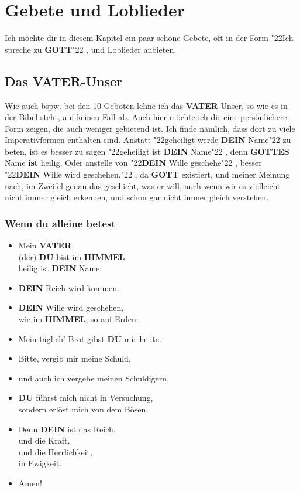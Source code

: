 \documentclass[10pt,a5paper]{article}
\newcommand{\Dein}[0]{\textbf{DEIN}}
\newcommand{\Du}[0]{\textbf{DU}}
\newcommand{\Gottes}[0]{\textbf{GOTTES}}
\newcommand{\Gott}[0]{\textbf{GOTT}}
\newcommand{\Himmel}[0]{\textbf{HIMMEL}}
\newcommand{\Vater}[0]{\textbf{VATER}}
\newcommand{\q}[1]{\char"22{#1}\char"22 }
\begin{document}
	\newpage
	\section{Gebete und Loblieder}
		Ich m\"ochte dir in diesem Kapitel ein paar sch\"one Gebete,
		oft in der Form \q{Ich spreche zu {\Gott}},
		und Loblieder anbieten.
	
	\subsection{Das {\Vater}-Unser}
		Wie auch bspw. bei den 10 Geboten lehne ich das {\Vater}-Unser,
		so wie es in der Bibel steht,
		auf keinen Fall ab.
		Auch hier m\"ochte ich dir eine pers\"onlichere Form zeigen,
		die auch weniger gebietend ist.
		Ich finde n\"amlich,
		dass dort zu viele Imperativformen enthalten sind.
		Anstatt \q{geheiligt werde {\Dein} Name} zu beten,
		ist es besser zu sagen \q{geheiligt ist {\Dein} Name},
		denn {\Gottes} Name \textbf{ist} heilig.
		Oder anstelle von \q{{\Dein} Wille geschehe},
		besser \q{{\Dein} Wille wird geschehen.},
		da {\Gott} existiert,
		und meiner Meinung nach,
		im Zweifel genau das geschieht,
		was er will,
		auch wenn wir es vielleicht nicht immer gleich erkennen,
		und schon gar nicht immer gleich verstehen.
	
	\subsubsection{Wenn du alleine betest}
		\begin{itemize}[nosep]
			\item	Mein {\Vater},
					\\
					(der) {\Du} bist im {\Himmel},
					\\
					heilig ist {\Dein} Name.
			\item	{\Dein} Reich wird kommen.
			\item	{\Dein} Wille wird geschehen,
					\\
					wie im {\Himmel},
					so auf Erden.
			\item	Mein t\"aglich' Brot gibst {\Du} mir heute.
			\item	Bitte,
					vergib mir meine Schuld,
			\item[]	und auch ich vergebe meinen Schuldigern.
			\item	{\Du} f\"uhrst mich nicht in Versuchung,
					\\
					sondern erl\"ost mich von dem B\"osen.
			\item	Denn {\Dein} ist das Reich,
					\\
					und die Kraft,
					\\
					und die Herrlichkeit,
					\\
					in Ewigkeit.
			\item	Amen!
		\end{itemize}
			
\end{document}
